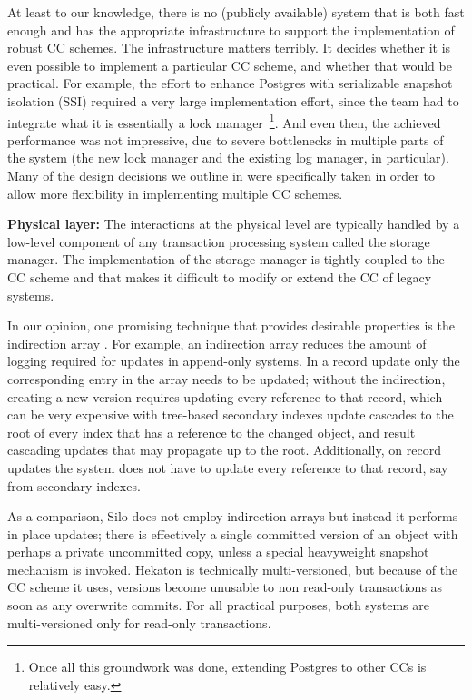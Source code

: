 At least to our knowledge, there is no (publicly available) system that is both fast enough and has the appropriate infrastructure to support the implementation of robust CC schemes. The infrastructure matters terribly. It decides whether it is even possible to implement a particular CC scheme, and whether that would be practical. For example, the effort to enhance Postgres with serializable snapshot isolation (SSI) required a very large implementation effort, since the team had to integrate what it is essentially a lock manager~\footnote{Once all this groundwork was done, extending Postgres to other CCs is relatively easy.}. And even then, the achieved performance was not impressive, due to severe bottlenecks in multiple parts of the system (the new lock manager and the existing log manager, in particular).  Many of the design decisions we outline in  were specifically taken in order to allow more flexibility in implementing multiple CC schemes.

\vspace{2mm}
{\bf Physical layer:} 
The interactions at the physical level are typically handled by a low-level component of any transaction processing system called the storage manager.
The implementation of the storage manager is tightly-coupled to the CC scheme and that makes it difficult to modify or extend the CC of legacy systems.  

In our opinion, one promising technique that provides desirable properties is the indirection array \cite{SadoghiRCB13,Diaconu+13}.
For example, an indirection array reduces the amount of logging required for updates in append-only systems. In a record update only the corresponding entry in the array needs to be updated; without the indirection, creating a new version requires updating every reference to that record, which can be very expensive with tree-based secondary indexes update cascades to the root of every index that has a reference to the changed object, and result cascading updates that may propagate up to the root. Additionally, on record updates the system does not have to update every reference to that record, say from secondary indexes.

As a comparison, Silo does not employ indirection arrays but instead it performs in place updates; there is effectively a single committed version of an object with perhaps a private uncommitted copy, unless a special heavyweight snapshot mechanism is invoked. Hekaton is technically multi-versioned, but because of the CC scheme it uses, versions become unusable to non read-only transactions as soon as any overwrite commits. For all practical purposes, both systems are multi-versioned only for read-only transactions.

